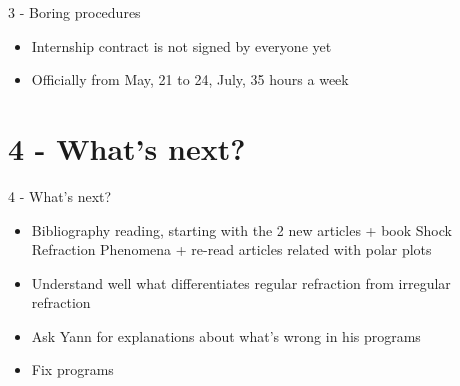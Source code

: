 \documentclass{beamer}
\begin{document}
\begin{frame}{3 - Boring procedures}

\begin{itemize}
\item Internship contract is not signed by everyone yet 
\item Officially from May, 21 to 24, July, 35 hours a week
\end{itemize}

\end{frame}

\section{4 - What's next?}

\begin{frame}{4 - What's next?}

\begin{itemize}
\item Bibliography reading, starting with the 2 new articles + book Shock Refraction Phenomena + re-read articles related with polar plots
\item Understand well what differentiates regular refraction from irregular refraction 
\item Ask Yann for explanations about what's wrong in his programs
\item Fix programs
\end{itemize}

\end{frame}
\end{document}
